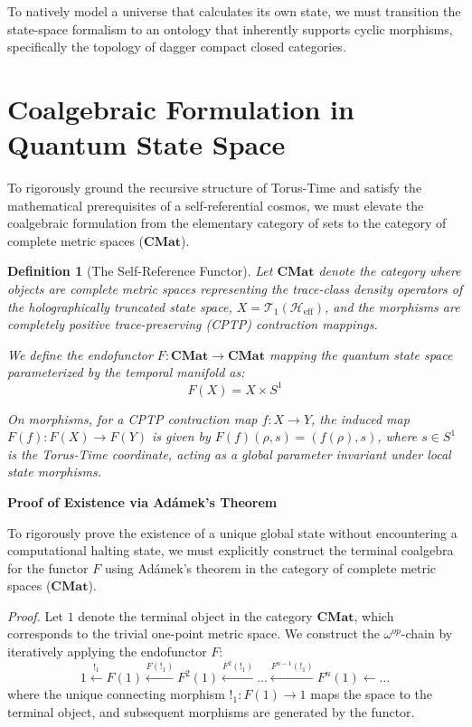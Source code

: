 \documentclass[12pt,openany]{book}
\theoremstyle{plain}
\newtheorem{definition}{Definition}[chapter]
\theoremstyle{definition}
\theoremstyle{remark}
\begin{document}
To natively model a universe that calculates its own state, we must transition the state-space formalism to an ontology that inherently supports cyclic morphisms, specifically the topology of dagger compact closed categories.

\section{Coalgebraic Formulation in Quantum State Space}
To rigorously ground the recursive structure of Torus-Time and satisfy the mathematical prerequisites of a self-referential cosmos, we must elevate the coalgebraic formulation from the elementary category of sets to the category of complete metric spaces ($\mathbf{CMat}$).

\begin{definition}[The Self-Reference Functor]
Let $\mathbf{CMat}$ denote the category where objects are complete metric spaces representing the trace-class density operators of the holographically truncated state space, $X = \mathcal{T}_1(\mathcal{H}_{\text{eff}})$, and the morphisms are completely positive trace-preserving (CPTP) contraction mappings. 

We define the endofunctor $F: \mathbf{CMat} \to \mathbf{CMat}$ mapping the quantum state space parameterized by the temporal manifold as:
$$F(X) = X \times S^1$$

On morphisms, for a CPTP contraction map $f: X \to Y$, the induced map $F(f): F(X) \to F(Y)$ is given by $F(f)(\rho, s) = (f(\rho), s)$, where $s \in S^1$ is the Torus-Time coordinate, acting as a global parameter invariant under local state morphisms.
\end{definition}

\textbf{Proof of Existence via Adámek's Theorem}

To rigorously prove the existence of a unique global state without encountering a computational halting state, we must explicitly construct the terminal coalgebra for the functor $F$ using Adámek's theorem in the category of complete metric spaces ($\mathbf{CMat}$).

\textit{Proof.} Let $1$ denote the terminal object in the category $\mathbf{CMat}$, which corresponds to the trivial one-point metric space. We construct the $\omega^{op}$-chain by iteratively applying the endofunctor $F$:
$$1 \xleftarrow{!_1} F(1) \xleftarrow{F(!_1)} F^2(1) \xleftarrow{F^2(!_1)} \dots \xleftarrow{F^{n-1}(!_1)} F^n(1) \xleftarrow{} \dots$$
where the unique connecting morphism $!_1: F(1) \to 1$ maps the space to the terminal object, and subsequent morphisms are generated by the functor. 
\end{document}
